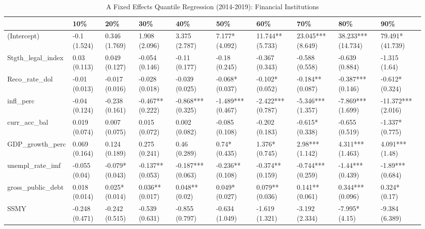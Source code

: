 \begin{table}[ht]
\centering
\caption{A Fixed Effects Quantile Regression (2014-2019): Financial Institutions} 
\begingroup\small
\begin{tabular}{llllllllll}
  \toprule
 & 10\% & 20\% & 30\% & 40\% & 50\% & 60\% & 70\% & 80\% & 90\% \\ 
  \midrule
(Intercept) & -0.1 (1.524) & 0.346 (1.769) & 1.908 (2.096) & 3.375 (2.787) & 7.177* (4.092) & 11.744** (5.733) & 23.045*** (8.649) & 38.233*** (14.734) & 79.491* (41.739) \\ 
  Stgth\_legal\_index & 0.03 (0.113) & 0.049 (0.127) & -0.054 (0.146) & -0.11 (0.177) & -0.18 (0.245) & -0.367 (0.343) & -0.588 (0.558) & -0.639 (0.884) & -1.315 (1.64) \\ 
  Reco\_rate\_dol & -0.01 (0.013) & -0.017 (0.016) & -0.028 (0.018) & -0.039 (0.025) & -0.068* (0.037) & -0.102* (0.052) & -0.184** (0.087) & -0.387*** (0.146) & -0.612* (0.324) \\ 
  infl\_perc & -0.04 (0.124) & -0.238 (0.161) & -0.467** (0.222) & -0.868*** (0.325) & -1.489*** (0.467) & -2.422*** (0.787) & -5.346*** (1.357) & -7.869*** (1.699) & -11.372*** (2.016) \\ 
  curr\_acc\_bal & 0.019 (0.074) & 0.007 (0.075) & 0.015 (0.072) & 0.002 (0.082) & -0.085 (0.108) & -0.202 (0.183) & -0.615* (0.338) & -0.655 (0.519) & -1.337* (0.775) \\ 
  GDP\_growth\_perc & 0.069 (0.164) & 0.124 (0.189) & 0.275 (0.241) & 0.46 (0.289) & 0.74* (0.435) & 1.376* (0.745) & 2.98*** (1.142) & 4.311*** (1.463) & 4.091*** (1.48) \\ 
  unempl\_rate\_imf & -0.055 (0.04) & -0.079* (0.043) & -0.137** (0.053) & -0.187*** (0.063) & -0.236** (0.108) & -0.374** (0.159) & -0.744*** (0.259) & -1.44*** (0.439) & -1.89*** (0.684) \\ 
  gross\_public\_debt & 0.018 (0.014) & 0.025* (0.014) & 0.036** (0.017) & 0.048** (0.02) & 0.049* (0.027) & 0.079** (0.036) & 0.141** (0.061) & 0.344*** (0.096) & 0.324* (0.17) \\ 
  SSMY & -0.248 (0.471) & -0.242 (0.515) & -0.539 (0.631) & -0.855 (0.797) & -0.634 (1.049) & -1.619 (1.321) & -3.192 (2.334) & -7.995* (4.15) & -9.384 (6.389) \\ 
   \bottomrule
\end{tabular}
\endgroup
\end{table}

